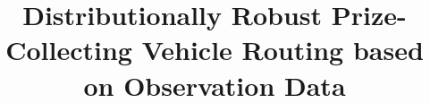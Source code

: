 \documentclass[preprint,12pt,authoryear]{elsarticle}
\theoremstyle{definition}
\begin{document}
\begin{frontmatter}



\title{
Distributionally Robust Prize-Collecting Vehicle Routing based on Observation Data
}




\begin{abstract}




\end{abstract}
\end{frontmatter}
\end{document}
